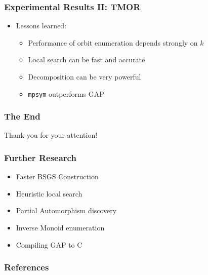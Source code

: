 \documentclass{beamer}
\begin{document}
\begin{frame}
  \frametitle{Experimental Results II: TMOR}

  \begin{itemize}
    \item Lessons learned:
      \begin{itemize}
        \setlength\itemsep{.25cm}

        \item<1-> Performance of orbit enumeration depends strongly on $k$
        \item<2-> Local search can be fast and accurate
        \item<3-> Decomposition can be very powerful
        \item<4-> \texttt{mpsym} outperforms GAP
      \end{itemize}
  \end{itemize}
\end{frame}

\begin{frame}
  \frametitle{The End}

  \begin{center}
    Thank you for your attention!
  \end{center}
\end{frame}

\begin{frame}
  \frametitle{Further Research}

  \begin{itemize}
    \setlength\itemsep{.25cm}

    \item<1-> Faster BSGS Construction
    \item<2-> Heuristic local search
    \item<3-> Partial Automorphism discovery
    \item<4-> Inverse Monoid enumeration
    \item<5-> Compiling GAP to C
  \end{itemize}
\end{frame}

\begin{frame}
  \frametitle{References}

  \tiny

  
  
\end{frame}
\end{document}
